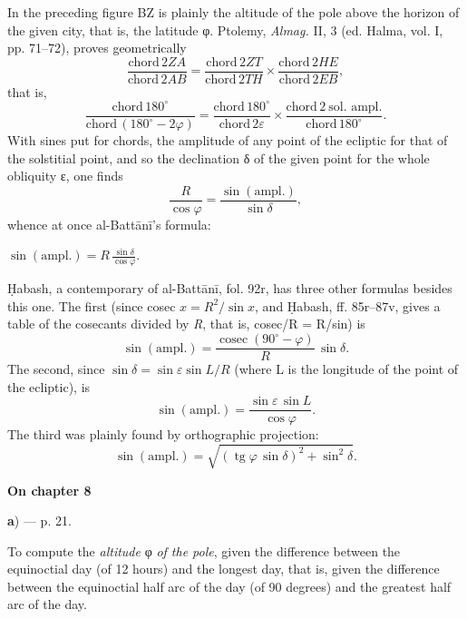 \documentclass[11pt]{article}
\newcommand{\Pg}[1]{\marginpar{\footnotesize\color{gray}#1}}
\newcommand{\UnitHead}[2]{\par\setcounter{footnoteT}{0}\needspace{8\baselineskip}\bigskip\pdfbookmark[1]{#1}{unit-#2}\hypertarget{EN-#2}{}%
 {\large\bfseries\interlinepenalty=10000 #1\par}\nobreak\medskip}
\begin{document}
\par In the preceding figure BZ is plainly the altitude of the pole above the horizon of the given city, that is, the latitude {\greekfont φ}. Ptolemy, \emph{Almag.} II, 3 (ed. Halma, vol. I, pp. 71–72), proves geometrically \[ \frac{\text{chord}\,2ZA}{\text{chord}\,2AB} = \frac{\text{chord}\,2ZT}{\text{chord}\,2TH} \times \frac{\text{chord}\,2HE}{\text{chord}\,2EB}, \] that is, \[ \frac{\text{chord}\,180^\circ}{\text{chord}\,(180^\circ - 2\varphi)} = \frac{\text{chord}\,180^\circ}{\text{chord}\,2\varepsilon} \times \frac{\text{chord}\,2\ \text{sol. ampl.}}{\text{chord}\,180^\circ}. \] With sines put for chords, the amplitude of any point of the ecliptic for that of the solstitial point, and so the declination {\greekfont δ} of the given point for the whole obliquity {\greekfont ε}, one finds \[ \frac{R}{\cos\varphi} = \frac{\sin(\text{ampl.})}{\sin\delta}, \] whence at once al-Battānī's formula: \par\noindent\hspace*{1.5em}$\displaystyle \sin(\text{ampl.}) = R\,\frac{\sin\delta}{\cos\varphi}.$\par\par
\par Ḥabash, a contemporary of al-Battānī, fol. 92r, has three other formulas besides this one. The first (since cosec $x = R^2/\sin x$, and Ḥabash, ff. 85r–87v, gives a table of the cosecants divided by \emph{R}, that is, cosec/R = R/sin) is \[ \sin(\text{ampl.}) = \frac{\operatorname{cosec}(90^\circ - \varphi)}{R}\,\sin\delta. \] The second, since $\sin\delta = \sin\varepsilon \sin L / R$ (where L is the longitude of the point of the ecliptic), is \[ \sin(\text{ampl.}) = \frac{\sin\varepsilon\,\sin L}{\cos\varphi}. \] The third was plainly found by orthographic projection: \[ \sin(\text{ampl.}) = \sqrt{(\operatorname{tg}\varphi\,\sin\delta)^2 + \sin^2\delta}. \]\par
\UnitHead{On chapter 8}{A08}\Pg{I 179}
\par\begin{center}\textbf{a}) — p. 21.\end{center}
\par To compute the \emph{altitude} {\greekfont φ} \emph{of the pole}, given the difference between the equinoctial day (of 12 hours) and the longest day, that is, given the difference between the equinoctial half arc of the day (of 90 degrees) and the greatest half arc of the day.\par
\end{document}
